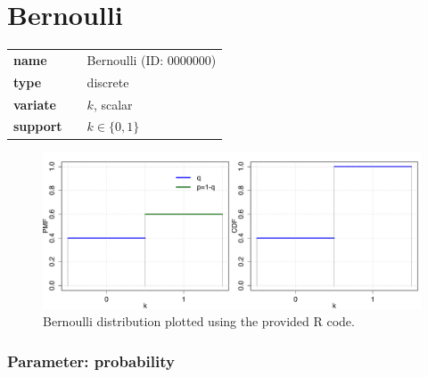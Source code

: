 


\section*{Bernoulli} 

  \bigskip 

\begin{tabular}{p{2cm}cl}
\textbf{name} & & Bernoulli (ID: 0000000)\\ 
 
\textbf{type} & & discrete \\ 

\textbf{variate} & & $k$, scalar \\ 

\textbf{support} & & $k \in \{0,1\}$
\end{tabular}

\begin{figure}[ht!]
\centering
  \includegraphics[width=140mm]{pics/Bernoulli.pdf}
 \caption{Bernoulli distribution plotted using the provided R code.}
 \label{fig:Bernoulli}
\end{figure}

\subsubsection*{Parameter: probability}

